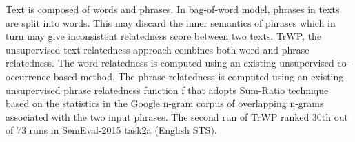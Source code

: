 Text is composed of words and phrases. In bag-of-word model, phrases in texts are split into words. This may discard the inner semantics of phrases which in turn may give inconsistent relatedness score between two texts. TrWP, the unsupervised text relatedness approach combines both word and phrase relatedness. The word relatedness is computed using an existing unsupervised co-occurrence based method. The phrase relatedness is computed using an existing unsupervised phrase relatedness function f that adopts Sum-Ratio technique based on the statistics in the Google n-gram corpus of overlapping n-grams associated with the two input phrases. The second run of TrWP ranked 30th out of 73 runs in SemEval-2015 task2a (English STS).
